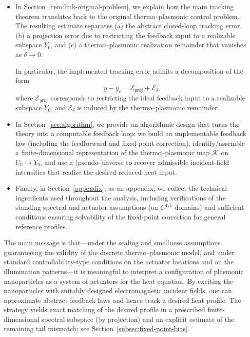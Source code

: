 \documentclass[11pt,a4paper]{article}
\numberwithin{equation}{section}
\theoremstyle{definition}
\newcommand{\1}{\mathbbm{1}}
\begin{document}
\begin{itemize}
\item[(v)] In Section~\ref{rem:link-original-problem}, we explain how the main tracking theorem translates back to the original thermo--plasmonic control problem. The resulting estimate separates (a) the abstract closed-loop tracking error, (b) a projection error due to restricting the feedback input to a realizable subspace $Y_0$, and (c) a thermo--plasmonic realization remainder that vanishes as $\delta\to0$.
\par\smallskip
In particular, the implemented tracking error admits a decomposition of the form
\[
y-y_r=\mathcal E_{\mathrm{proj}}+\mathcal E_{\delta},
\]
where $\mathcal E_{\mathrm{proj}}$ corresponds to restricting the ideal feedback input to a realizable subspace $Y_0$, and $\mathcal E_{\delta}$ is induced by the thermo--plasmonic remainder.


\item[(vi)] In Section~\ref{sec:algorithm}, we provide an algorithmic design that turns the theory into a computable feedback loop: we build an implementable feedback law (including the feedforward and fixed-point correction), identify/assemble a finite-dimensional representation of the thermo--plasmonic map $\mathcal K$ on $U_0\to Y_0$, and use a (pseudo-)inverse to recover admissible incident-field intensities that realize the desired reduced heat input.

\item[(vii)] Finally, in Section~\ref{appendix},  as an appendix, we collect the technical ingredients used throughout the analysis, including verifications of the standing spectral and actuator assumptions (on $C^{1,1}$ domains) and sufficient conditions ensuring solvability of the fixed-point correction for general reference profiles.

\end{itemize}





\noindent The main message is that---under the scaling and smallness assumptions
guaranteeing the validity of the discrete thermo--plasmonic model, and under
standard controllability-type conditions on the actuator locations and on the illumination patterns---it is meaningful to interpret a configuration of
plasmonic nanoparticles as a system of actuators for the heat equation. By exciting the nanoparticles with suitably designed electromagnetic incident fields, one
can approximate abstract feedback laws and hence track a desired heat profile. The strategy yields exact matching of the desired profile in a prescribed finite-dimensional spectral subspace (by projection) and an explicit estimate of the remaining tail mismatch; see Section~\ref{subsec:fixed-point-bias}.
\bigskip
\end{document}

